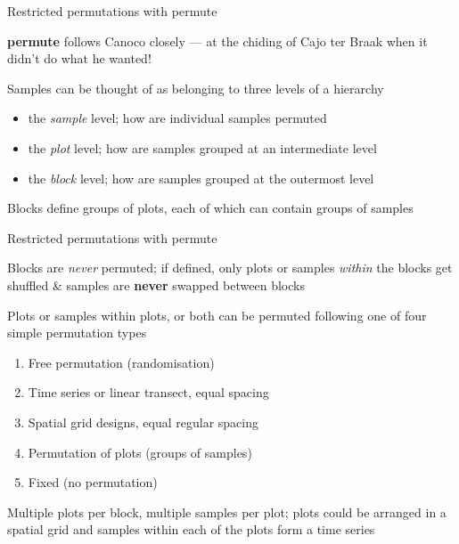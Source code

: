 \documentclass[10pt,ignorenonframetext,compress, aspectratio=169]{beamer}
\begin{document}
\begin{frame}{Restricted permutations with permute}

\textbf{permute} follows Canoco closely --- at the chiding of Cajo ter
Braak when it didn't do what he wanted!

Samples can be thought of as belonging to three levels of a hierarchy

\begin{itemize}
\itemsep1pt\parskip0pt
\item
  the \emph{sample} level; how are individual samples permuted
\item
  the \emph{plot} level; how are samples grouped at an intermediate
  level
\item
  the \emph{block} level; how are samples grouped at the outermost level
\end{itemize}

Blocks define groups of plots, each of which can contain groups of
samples

\end{frame}

\begin{frame}{Restricted permutations with permute}

Blocks are \emph{never} permuted; if defined, only plots or samples
\emph{within} the blocks get shuffled \& samples are \textbf{never}
swapped between blocks

Plots or samples within plots, or both can be permuted following one of
four simple permutation types

\begin{enumerate}
\def\labelenumi{\arabic{enumi}.}
\itemsep1pt\parskip0pt
\item
  Free permutation (randomisation)
\item
  Time series or linear transect, equal spacing
\item
  Spatial grid designs, equal regular spacing
\item
  Permutation of plots (groups of samples)
\item
  Fixed (no permutation)
\end{enumerate}

Multiple plots per block, multiple samples per plot; plots could be
arranged in a spatial grid and samples within each of the plots form a
time series

\end{frame}
\end{document}
